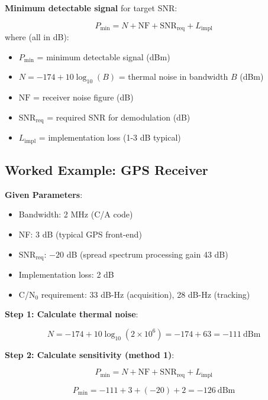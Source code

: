 \textbf{Minimum detectable signal} for target SNR:

\begin{equation}
P_{\text{min}} = N + \text{NF} + \text{SNR}_{\text{req}} + L_{\text{impl}}
\end{equation}
where (all in dB):
\begin{itemize}
\item $P_{\text{min}}$ = minimum detectable signal (dBm)
\item $N = -174 + 10\log_{10}(B)$ = thermal noise in bandwidth $B$ (dBm)
\item $\text{NF}$ = receiver noise figure (dB)
\item $\text{SNR}_{\text{req}}$ = required SNR for demodulation (dB)
\item $L_{\text{impl}}$ = implementation loss (1-3 dB typical)
\end{itemize}

\subsection{Worked Example: GPS Receiver}

\textbf{Given Parameters}:
\begin{itemize}
\item Bandwidth: 2 MHz (C/A code)
\item NF: 3 dB (typical GPS front-end)
\item $\text{SNR}_{\text{req}}$: $-20$ dB (spread spectrum processing gain 43 dB)
\item Implementation loss: 2 dB
\item C/N$_0$ requirement: 33 dB-Hz (acquisition), 28 dB-Hz (tracking)
\end{itemize}

\textbf{Step 1: Calculate thermal noise}:

\begin{equation}
N = -174 + 10\log_{10}(2 \times 10^6) = -174 + 63 = -111~\text{dBm}
\end{equation}

\textbf{Step 2: Calculate sensitivity (method 1)}:

\begin{equation}
P_{\text{min}} = N + \text{NF} + \text{SNR}_{\text{req}} + L_{\text{impl}}
\end{equation}

\begin{equation}
P_{\text{min}} = -111 + 3 + (-20) + 2 = -126~\text{dBm}
\end{equation}

